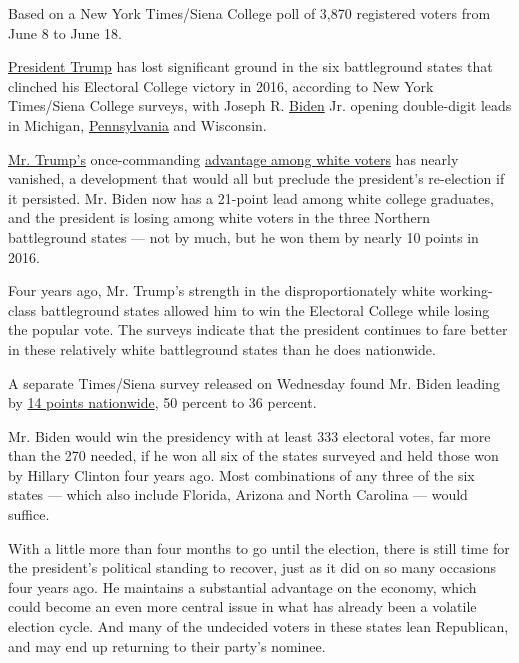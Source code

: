 Based on a New York Times/Siena College poll of 3,870 registered voters
from June 8 to June 18.

\href{https://www.nytimes3xbfgragh.onion/interactive/2020/us/elections/donald-trump.html}{President
Trump} has lost significant ground in the six battleground states that
clinched his Electoral College victory in 2016, according to New York
Times/Siena College surveys, with Joseph R.
\href{https://www.nytimes3xbfgragh.onion/2020/07/03/upshot/joe-biden-voters-coronavirus.html}{Biden}
Jr. opening double-digit leads in Michigan,
\href{https://www.nytimes3xbfgragh.onion/2020/07/02/us/politics/pennsylvania-trump-biden.html}{Pennsylvania}
and Wisconsin.

\href{https://www.nytimes3xbfgragh.onion/2020/07/02/us/politics/pennsylvania-trump-biden.html}{Mr.
Trump's} once-commanding
\href{https://www.nytimes3xbfgragh.onion/2020/06/29/us/politics/trump-swing-voters.html}{advantage
among white voters} has nearly vanished, a development that would all
but preclude the president's re-election if it persisted. Mr. Biden now
has a 21-point lead among white college graduates, and the president is
losing among white voters in the three Northern battleground states ---
not by much, but he won them by nearly 10 points in 2016.

Four years ago, Mr. Trump's strength in the disproportionately white
working-class battleground states allowed him to win the Electoral
College while losing the popular vote. The surveys indicate that the
president continues to fare better in these relatively white
battleground states than he does nationwide.

A separate Times/Siena survey released on Wednesday found Mr. Biden
leading by
\href{https://www.nytimes3xbfgragh.onion/2020/06/24/us/politics/trump-biden-poll-nyt-upshot-siena-college.html}{14
points nationwide}, 50 percent to 36 percent.

Mr. Biden would win the presidency with at least 333 electoral votes,
far more than the 270 needed, if he won all six of the states surveyed
and held those won by Hillary Clinton four years ago. Most combinations
of any three of the six states --- which also include Florida, Arizona
and North Carolina --- would suffice.

With a little more than four months to go until the election, there is
still time for the president's political standing to recover, just as it
did on so many occasions four years ago. He maintains a substantial
advantage on the economy, which could become an even more central issue
in what has already been a volatile election cycle. And many of the
undecided voters in these states lean Republican, and may end up
returning to their party's nominee.


